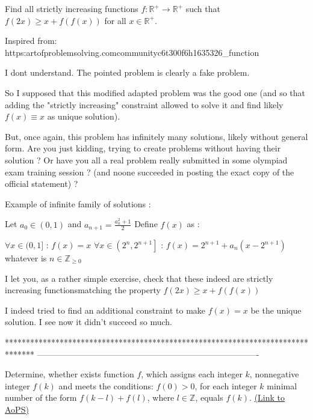\begin{solution}
	\begin{tcolorbox}Find all strictly increasing functions $f:\mathbb R^+\to\mathbb R^+$ such that
$f(2x)\geq x+f(f(x))$
for all $x\in\mathbb R^+$.

Inspired from:
https:\/\/artofproblemsolving.com\/community\/c6t300f6h1635326_function\end{tcolorbox}
I dont understand.
The pointed problem is clearly a fake problem.

So I supposed that this modified \/ adapted problem was the good one (and so that adding the "strictly increasing" constraint allowed to solve it and find likely $f(x)\equiv x$ as unique solution).

But, once again, this problem has infinitely many solutions, likely without general form.
Are you just kidding, trying to create problems without having their solution ?
Or have you all a real problem really submitted in some olympiad exam \/ training session ? (and noone succeeded in posting the exact copy of the official statement) ?

Example of infinite family of solutions :

Let $a_0\in(0,1)$ and $a_{n+1}=\frac{a_n^2+1}2$
Define $f(x)$ as :

$\forall x\in(0,1]$ : $f(x)=x$
$\forall x\in\left(2^n,2^{n+1}\right]$ : $f(x)=2^{n+1}+a_n(x-2^{n+1})$ whatever is $n\in\mathbb Z_{\ge 0}$

I let you, as a rather simple exercise, check that these indeed are strictly increasing functionsmatching the property $f(2x)\ge x+f(f(x))$



\end{solution}



\begin{solution}
	I indeed tried to find an additional constraint to make $f(x)=x$ be the unique solution. I see now it didn’t succeed so much.
\end{solution}
*******************************************************************************
-------------------------------------------------------------------------------

\begin{problem}
	Determine, whether exists function $f$, which assigns each integer $k$, nonnegative integer $f(k)$ and meets the conditions:
$f(0) > 0$,
for each integer $k$ minimal number of the form $f(k - l) + f(l)$, where $l \in \mathbb{Z}$, equals $f(k)$.
	\flushright \href{https://artofproblemsolving.com/community/c6h1636068}{(Link to AoPS)}
\end{problem}



